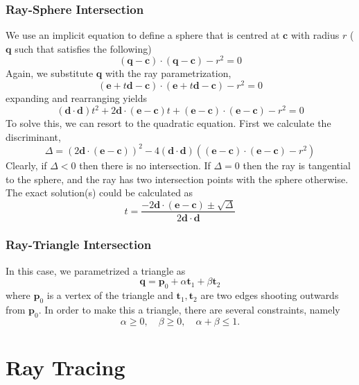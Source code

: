 \documentclass[11pt]{article}
\newcommand{\bc}{\mathbf{c}}
\newcommand{\bd}{\mathbf{d}}
\newcommand{\be}{\mathbf{e}}
\newcommand{\bp}{\mathbf{p}}
\newcommand{\bq}{\mathbf{q}}
\newcommand{\bt}{\mathbf{t}}
\begin{document}
\subsubsection{Ray-Sphere Intersection}
We use an implicit equation to define a sphere that is centred at $\bc$ with radius $r$ ($\bq$ such that satisfies the following)
\begin{equation}
	(\bq - \bc) \cdot (\bq - \bc) - r^2 = 0
\end{equation}
Again, we substitute $\bq$ with the ray parametrization, 
\begin{equation}
	(\be + t \bd - \bc ) \cdot (\be + t \bd - \bc ) - r^2 = 0 
\end{equation}
expanding and rearranging yields
\begin{equation}
	(\bd \cdot \bd) t^2 + 2\bd \cdot (\be - \bc) t + (\be - \bc) \cdot (\be - \bc) - r^2 = 0
\end{equation}
To solve this, we can resort to the quadratic equation. First we calculate the discriminant, 
\begin{equation}
	\Delta = (2\bd \cdot (\be - \bc)) ^2 - 4(\bd \cdot \bd)((\be - \bc) \cdot (\be - \bc) - r^2)
\end{equation}
Clearly, if $\Delta < 0$ then there is no intersection. If $\Delta = 0$ then the ray is tangential to the sphere, and the ray has two intersection points with the sphere otherwise. The exact solution(s) could be calculated as 
\begin{equation}
	t = \frac{-2\bd\cdot(\be - \bc) \pm \sqrt{\Delta}}{2\bd \cdot \bd}
\end{equation}

\subsubsection{Ray-Triangle Intersection}
In this case, we parametrized a triangle as 
\begin{equation}
	\bq = \bp_0 + \alpha \bt_1 + \beta \bt_2
\end{equation}
where $\bp_0$ is a vertex of the triangle and $\bt_1, \bt_2$ are two edges shooting outwards from $\bp_0$. In order to make this a triangle, there are several constraints, namely
\begin{equation}
	\alpha \geq 0, \quad \beta \geq 0, \quad \alpha + \beta \leq 1.
\end{equation}

\section{Ray Tracing}
\end{document}
